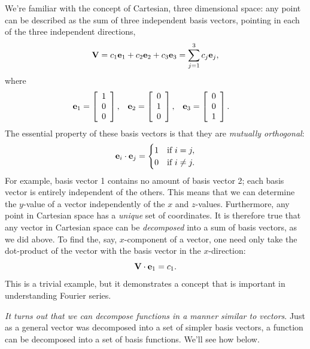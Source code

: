 \documentclass[11pt,twoside,a4paper]{article}
\begin{document}
We're familiar with the concept of Cartesian, three dimensional space:
any point can be described as the sum of three independent basis
vectors, pointing in each of the three independent directions,
\begin{equation}
  \label{eq:vec}
  \mbox{{\bf V}} = c_1\mbox{{\bf e}}_1 + c_2\mbox{{\bf e}}_2 + c_3\mbox{{\bf e}}_3 = \sum_{j=1}^3 c_j\mbox{{\bf e}}_j, 
\end{equation}
where
\begin{align}
  \mbox{{\bf e}}_1 &=
  \left[\begin{array}{c}
    1 \\ 0 \\ 0
  \end{array}\right],&
  \mbox{{\bf e}}_2 &=
  \left[\begin{array}{c}
    0 \\ 1 \\ 0
  \end{array}\right],&
  \mbox{{\bf e}}_3 &=
  \left[\begin{array}{c}
    0 \\ 0 \\ 1
  \end{array}\right]. \nonumber
\end{align}
The essential property of these basis vectors is that they are
\textit{mutually orthogonal}:
\begin{equation}
  \label{eq:orthog}
  \mbox{{\bf e}}_i\cdot\mbox{{\bf e}}_j=
  \begin{cases}
    1 & \text{if }i=j,\\
    0 & \text{if }i\ne j.
  \end{cases}
\end{equation}
For example, basis vector 1 contains no amount of basis vector 2; each
basis vector is entirely independent of the others.  This means that
we can determine the $y$-value of a vector independently of the $x$
and $z$-values.  Furthermore, any point in Cartesian space has a
\textit{unique} set of coordinates.  It is therefore true that any
vector in Cartesian space can be \textit{decomposed} into a sum of
basis vectors, as we did above.  To find the, say, $x$-component of a
vector, one need only take the dot-product of the vector with the
basis vector in the $x$-direction:
\begin{displaymath}
  \mbox{{\bf V}}\cdot\mbox{{\bf e}}_1 = c_1.
\end{displaymath}
This is a trivial example, but it demonstrates a concept that is
important in understanding Fourier series.

\textit{It turns out that we can decompose functions in a manner
  similar to vectors}.  Just as a general vector was decomposed into a
set of simpler basis vectors, a function can be decomposed into a set
of basis functions.  We'll see how below.
\end{document}
